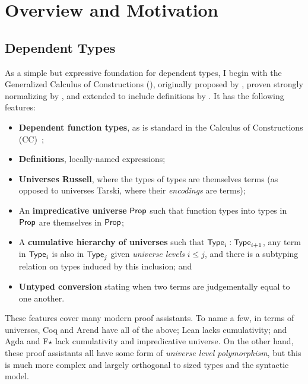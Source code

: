 \chapter{Overview and Motivation} \label{sec:overview}

\section{Dependent Types}

As a simple but expressive foundation for dependent types,
I begin with the Generalized Calculus of Constructions (\GCC),
originally proposed by \citet{GCC-Coquand},
proven strongly normalizing by \citet{GCC-Luo},
and extended to include definitions by \citet{universes}.
It has the following features:

\begin{itemize}
  \item \textbf{Dependent function types}, as is standard in the Calculus of Constructions (CC)~\citep{CoC};
  \item \textbf{Definitions}, \ie locally-named expressions;
  \item \textbf{Universes \ala Russell}, where the types of types are themselves terms
    (as opposed to universes \ala Tarski, where their \emph{encodings} are terms);
  \item An \textbf{impredicative universe} $\mathsf{Prop}$ such that function types into types in $\mathsf{Prop}$
    are themselves in $\mathsf{Prop}$;
  \item A \textbf{cumulative hierarchy of universes} such that $\mathsf{Type}_{i}: \mathsf{Type}_{i+1}$,
    any term in $\mathsf{Type}_{i}$ is also in $\mathsf{Type}_{j}$ given \emph{universe levels} $i \leq j$,
    and there is a subtyping relation on types induced by this inclusion; and
  \item \textbf{Untyped conversion} stating when two terms are judgementally equal to one another.
\end{itemize}

These features cover many modern proof assistants.
To name a few, in terms of universes,
Coq and Arend have all of the above;
Lean lacks cumulativity; and
Agda and F$\star$ lack cumulativity and impredicative universe.
On the other hand, these proof assistants all have some form of
\emph{universe level polymorphism},
but this is much more complex and largely orthogonal to sized types
and the syntactic model.

